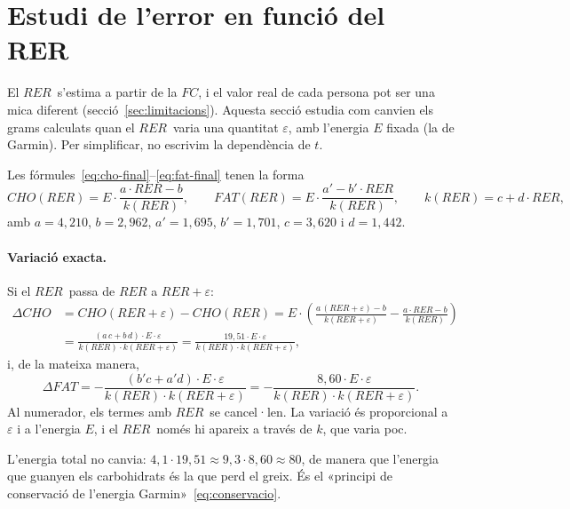 \documentclass[10pt,a4paper]{article}
\newcommand{\cho}{\ensuremath{\mathit{CHO}}}               %
\newcommand{\fat}{\ensuremath{\mathit{FAT}}}
\newcommand{\RER}{\ensuremath{\mathit{RER}}}
\newcommand{\FC}{\ensuremath{\mathit{FC}}}
\begin{document}
\section{Estudi de l'error en funció del RER}\label{sec:sensibilitat}

El \RER\ s'estima a partir de la \FC, i el valor real de cada persona pot ser una mica
diferent (secció~\ref{sec:limitacions}). Aquesta secció estudia com canvien els grams
calculats quan el \RER\ varia una quantitat $\varepsilon$, amb l'energia $E$ fixada (la de
Garmin). Per simplificar, no escrivim la dependència de $t$.

Les fórmules~\eqref{eq:cho-final}--\eqref{eq:fat-final} tenen la forma
\[
  \cho(\RER)=E\cdot\frac{a\cdot\RER-b}{k(\RER)},\qquad
  \fat(\RER)=E\cdot\frac{a'-b'\cdot\RER}{k(\RER)},\qquad
  k(\RER)=c+d\cdot\RER,
\]
amb $a=4{,}210$, $b=2{,}962$, $a'=1{,}695$, $b'=1{,}701$, $c=3{,}620$ i $d=1{,}442$.

\paragraph{Variació exacta.} Si el \RER\ passa de $\RER$ a $\RER+\varepsilon$:
\begin{equation}
\begin{aligned}
  \Delta\cho&=\cho(\RER+\varepsilon)-\cho(\RER)
  =E\cdot\left(\frac{a\,(\RER+\varepsilon)-b}{k(\RER+\varepsilon)}-\frac{a\cdot\RER-b}{k(\RER)}\right)\\[4pt]
  &=\frac{(a\,c+b\,d)\cdot E\cdot\varepsilon}{k(\RER)\cdot k(\RER+\varepsilon)}
  =\frac{19{,}51\cdot E\cdot\varepsilon}{k(\RER)\cdot k(\RER+\varepsilon)} ,
\end{aligned}
\label{eq:dcho}
\end{equation}
i, de la mateixa manera,
\begin{equation}
  \Delta\fat=-\frac{(b'c+a'd)\cdot E\cdot\varepsilon}{k(\RER)\cdot k(\RER+\varepsilon)}
  =-\frac{8{,}60\cdot E\cdot\varepsilon}{k(\RER)\cdot k(\RER+\varepsilon)} .
\label{eq:dfat}
\end{equation}
Al numerador, els termes amb \RER\ se cancel·len. La variació és proporcional a
$\varepsilon$ i a l'energia $E$, i el \RER\ només hi apareix a través de $k$, que varia poc.

L'energia total no canvia: $4{,}1\cdot19{,}51\approx9{,}3\cdot8{,}60\approx80$, de manera
que l'energia que guanyen els carbohidrats és la que perd el greix. És el «principi de
conservació de l'energia Garmin»~\eqref{eq:conservacio}.
\end{document}
